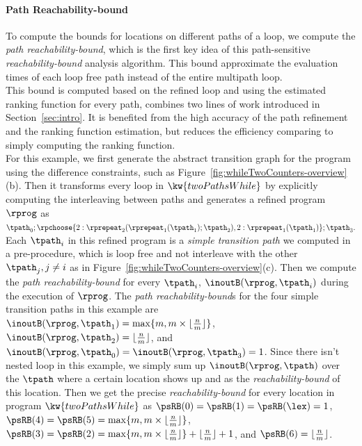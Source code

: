 \paragraph{Path Reachability-bound}
To compute the bounds for locations on different paths of a loop, we compute the \emph{path reachability-bound},
which is the first key idea of this path-sensitive \emph{reachability-bound} analysis algorithm. This bound approximate the evaluation times of each loop free path instead of the entire multipath loop.
\\
This bound is computed based on the refined loop and using the estimated ranking function for every path, combines two lines of work introduced in Section~\ref{sec:intro}. It is benefited from the high accuracy of the path refinement and the ranking function estimation, but reduces the efficiency comparing to simply computing the ranking function.
\\
For this example, we first
generate the abstract transition graph for the program using the difference constraints, such as Figure~\ref{fig:whileTwoCounters-overview}(b).
Then it transforms every loop in $\kw{twoPathsWhile}$ by explicitly computing the interleaving between paths and
generates a refined program $\rprog$ as
\\
% 
  $
  \tpath_0 ; 
  \rpchoose{2: \rprepeat_2(\rprepeat_1(\tpath_1); \tpath_2), 
  2: \rprepeat_1(\tpath_1)}; \tpath_3.
  $
\\
Each $\tpath_i$ in this refined program is a \emph{simple transition path} we computed in a pre-procedure, which is loop free and not interleave with the other $\tpath_j, j \neq i$ as in Figure~\ref{fig:whileTwoCounters-overview}(c).
Then we compute the \emph{path reachability-bound} for every $\tpath_i$,
$\inoutB(\rprog, \tpath_i)$ during the execution of $\rprog$.
The \emph{path reachability-bound}s for the four simple transition paths in this example are
$\inoutB(\rprog, \tpath_1) = \max\{m, m \times \lfloor\frac{n}{m}\rfloor\}$,
$\inoutB(\rprog, \tpath_2) = \lfloor\frac{n}{m}\rfloor$,
and $\inoutB(\rprog, \tpath_0) = \inoutB(\rprog, \tpath_3) = 1$.
Since there isn't nested loop in this example, we simply sum up $\inoutB(\rprog, \tpath)$ over the $\tpath$ where a certain location shows up
and as the \emph{reachability-bound} of this location.
Then we get the precise \emph{reachability-bound} for every location in program $\kw{twoPathsWhile}$ as
$\psRB(0) = \psRB(1) = \psRB(\lex) = 1$,
$\psRB(4) = \psRB(5) = \max\{m, m \times \lfloor\frac{n}{m}\rfloor\}$,
$\psRB(3) = \psRB(2) = \max\{m, m \times \lfloor\frac{n}{m}\rfloor\} + \lfloor\frac{n}{m}\rfloor + 1 $,
and $\psRB(6) = \lfloor\frac{n}{m}\rfloor$.
%
